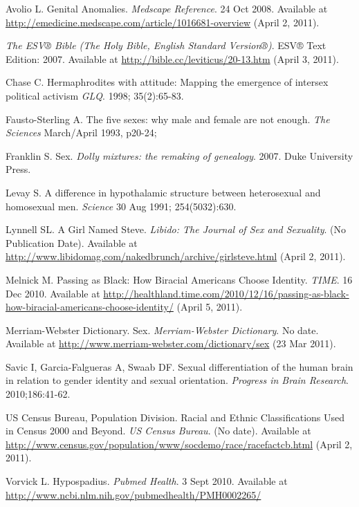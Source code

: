  

\begin{thebibliography}{99}


 Avolio L. Genital Anomalies. {\it Medscape Reference}. 24 Oct 2008. Available at \url{http://emedicine.medscape.com/article/1016681-overview} (April 2, 2011).

 {\it The ESV® Bible (The Holy Bible, English Standard Version®)}. ESV® Text Edition: 2007. Available at \url{http://bible.cc/leviticus/20-13.htm} (April 3, 2011).

 Chase C. Hermaphrodites with attitude: Mapping the emergence of intersex political activism {\it GLQ}. 1998; 35(2):65-83.

 Fausto-Sterling A.  The five sexes: why male and female are not enough. {\it The Sciences} March/April 1993, p20-24;

 Franklin S. Sex. {\it Dolly mixtures: the remaking of genealogy}. 2007. Duke University Press.

 Levay S.  A difference in hypothalamic structure between heterosexual and homosexual men. {\it Science} 30 Aug 1991; 254(5032):630.

 Lynnell SL. A Girl Named Steve. {\it Libido: The Journal of Sex and Sexuality}. (No Publication Date). Available at \url{http://www.libidomag.com/nakedbrunch/archive/girlsteve.html} (April 2, 2011).

 Melnick M. Passing as Black: How Biracial Americans Choose Identity. {\it TIME}. 16 Dec 2010. Available at \url{http://healthland.time.com/2010/12/16/passing-as-black-how-biracial-americans-choose-identity/} (April 5, 2011).

 Merriam-Webster Dictionary. Sex. {\it Merriam-Webster Dictionary}. No date. Available at \url{http://www.merriam-webster.com/dictionary/sex} (23 Mar 2011).

 Savic I, Garcia-Falgueras A, Swaab DF.  Sexual differentiation of the human brain in relation to gender identity and sexual orientation. {\it Progress in Brain Research}. 2010;186:41-62.

 US Census Bureau, Population Division. Racial and Ethnic Classifications Used in Census 2000 and Beyond. {\it US Census Bureau}. (No date). Available at \url{http://www.census.gov/population/www/socdemo/race/racefactcb.html} (April 2, 2011).

 Vorvick L.  Hypospadius. {\it Pubmed Health}. 3 Sept 2010. Available at \url{http://www.ncbi.nlm.nih.gov/pubmedhealth/PMH0002265/}


\end{thebibliography}
